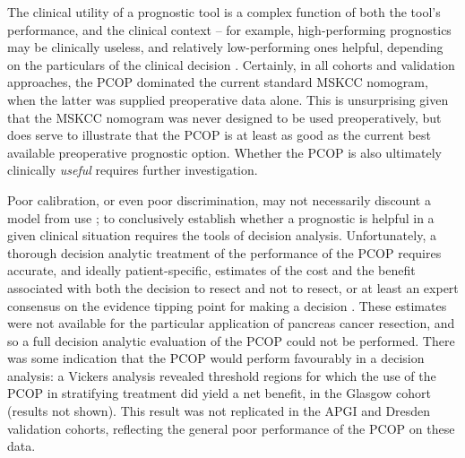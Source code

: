 \documentclass[dissertation.tex]{subfiles}
\begin{document}
The clinical utility of a prognostic tool is a complex function of both the tool's performance, and the clinical context -- for example, high-performing prognostics may be clinically useless, and relatively low-performing ones helpful, depending on the particulars of the clinical decision \cite{Vickers2010}.  Certainly, in all cohorts and validation approaches, the \gls{PCOP} dominated the current standard \gls{MSKCC} nomogram, when the latter was supplied preoperative data alone.  This is unsurprising given that the \gls{MSKCC} nomogram was never designed to be used preoperatively, but does serve to illustrate that the \gls{PCOP} is at least as good as the current best available preoperative prognostic option.  Whether the \gls{PCOP} is also ultimately clinically \emph{useful} requires further investigation.

Poor calibration, or even poor discrimination, may not necessarily discount a model from use \cite{Steyerberg2010}; to conclusively establish whether a prognostic is helpful in a given clinical situation requires the tools of decision analysis.  Unfortunately, a thorough decision analytic treatment of the performance of the \gls{PCOP} requires accurate, and ideally patient-specific, estimates of the cost and the benefit associated with both the decision to resect and not to resect, or at least an expert consensus on the evidence tipping point for making a decision \cite{Vickers2008}.  These estimates were not available for the particular application of pancreas cancer resection, and so a full decision analytic evaluation of the \gls{PCOP} could not be performed.  There was some indication that the \gls{PCOP} would perform favourably in a decision analysis: a Vickers analysis \cite{Vickers2008} revealed threshold regions for which the use of the \gls{PCOP} in stratifying treatment did yield a net benefit, in the Glasgow cohort (results not shown).  This result was not replicated in the \gls{APGI} and Dresden validation cohorts, reflecting the general poor performance of the \gls{PCOP} on these data.
\end{document}
